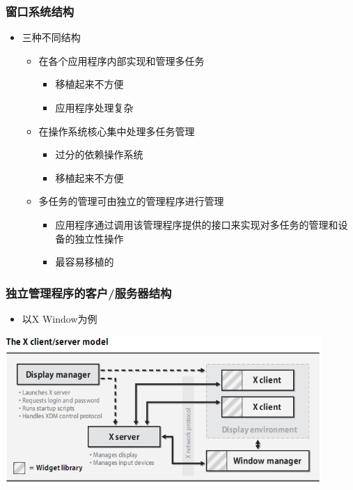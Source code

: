 \documentclass{beamer}
\begin{document}
\begin{frame}
	\frametitle{窗口系统结构}
	\beamertemplatetransparentcovereddynamicmedium
	\begin{itemize}
		\item 三种不同结构
		\begin{itemize}
			\item 在各个应用程序内部实现和管理多任务
			\begin{itemize}
				\item 移植起来不方便
				\item 应用程序处理复杂
			\end{itemize}
			\pause
			\item 在操作系统核心集中处理多任务管理
			\begin{itemize}
				\item 过分的依赖操作系统
				\item 移植起来不方便
			\end{itemize}
			\pause
			\item 多任务的管理可由独立的管理程序进行管理
			\begin{itemize}
				\item 应用程序通过调用该管理程序提供的接口来实现对多任务的管理和设备的独立性操作
				\item 最容易移植的
			\end{itemize}
		\end{itemize}
	\end{itemize}
\end{frame}

\begin{frame}
	\frametitle{独立管理程序的客户/服务器结构}
	\begin{itemize}
	\item 以X Window为例
	\end{itemize}
	\begin{center}
	\includegraphics[width=0.9\textwidth]{images/x-server-architecture.png}
	\end{center}
\end{frame}
\end{document}

